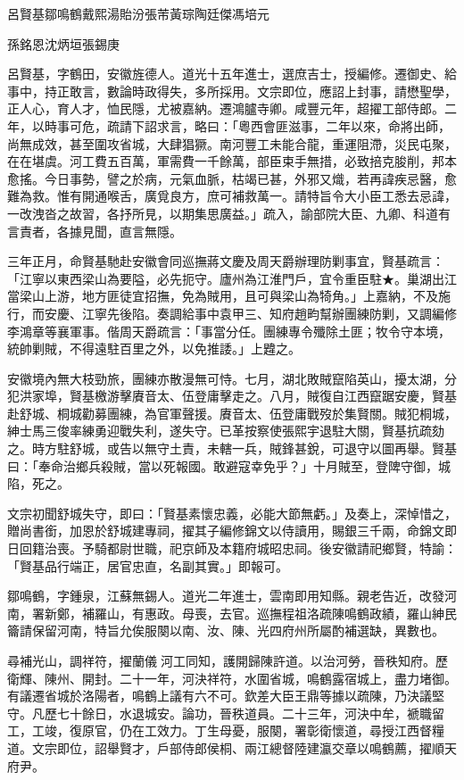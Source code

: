 
\begin{pinyinscope}
呂賢基鄒鳴鶴戴熙湯貽汾張芾黃琮陶廷傑馮培元

孫銘恩沈炳垣張錫庚

呂賢基，字鶴田，安徽旌德人。道光十五年進士，選庶吉士，授編修。遷御史、給事中，持正敢言，數論時政得失，多所採用。文宗即位，應詔上封事，請懋聖學，正人心，育人才，恤民隱，尤被嘉納。遷鴻臚寺卿。咸豐元年，超擢工部侍郎。二年，以時事可危，疏請下詔求言，略曰：「粵西會匪滋事，二年以來，命將出師，尚無成效，甚至圍攻省城，大肆猖獗。南河豐工未能合龍，重運阻滯，災民屯聚，在在堪虞。河工費五百萬，軍需費一千餘萬，部臣束手無措，必致掊克朘削，邦本愈搖。今日事勢，譬之於病，元氣血脈，枯竭已甚，外邪又熾，若再諱疾忌醫，愈難為救。惟有開通喉舌，廣覓良方，庶可補救萬一。請特旨令大小臣工悉去忌諱，一改洩沓之故習，各抒所見，以期集思廣益。」疏入，諭部院大臣、九卿、科道有言責者，各據見聞，直言無隱。

三年正月，命賢基馳赴安徽會同巡撫蔣文慶及周天爵辦理防剿事宜，賢基疏言：「江寧以東西梁山為要隘，必先扼守。廬州為江淮門戶，宜令重臣駐★。巢湖出江當梁山上游，地方匪徒宜招撫，免為賊用，且可與梁山為犄角。」上嘉納，不及施行，而安慶、江寧先後陷。奏調給事中袁甲三、知府趙畇幫辦團練防剿，又調編修李鴻章等襄軍事。偕周天爵疏言：「事當分任。團練專令殲除土匪；牧令守本境，統帥剿賊，不得遠駐百里之外，以免推諉。」上韙之。

安徽境內無大枝勁旅，團練亦散漫無可恃。七月，湖北敗賊竄陷英山，擾太湖，分犯洪家埠，賢基檄游擊賡音太、伍登庸擊走之。八月，賊復自江西竄踞安慶，賢基赴舒城、桐城勸募團練，為官軍聲援。賡音太、伍登庸戰歿於集賢關。賊犯桐城，紳士馬三俊率練勇迎戰失利，遂失守。已革按察使張熙宇退駐大關，賢基抗疏劾之。時方駐舒城，或告以無守土責，未轄一兵，賊鋒甚銳，可退守以圖再舉。賢基曰：「奉命治鄉兵殺賊，當以死報國。敢避寇幸免乎？」十月賊至，登陴守御，城陷，死之。

文宗初聞舒城失守，即曰：「賢基素懷忠義，必能大節無虧。」及奏上，深悼惜之，贈尚書銜，加恩於舒城建專祠，擢其子編修錦文以侍讀用，賜銀三千兩，命錦文即日回籍治喪。予騎都尉世職，祀京師及本籍府城昭忠祠。後安徽請祀鄉賢，特諭：「賢基品行端正，居官忠直，名副其實。」即報可。

鄒鳴鶴，字鍾泉，江蘇無錫人。道光二年進士，雲南即用知縣。親老告近，改發河南，署新鄭，補羅山，有惠政。母喪，去官。巡撫程祖洛疏陳鳴鶴政績，羅山紳民籥請保留河南，特旨允俟服闋以南、汝、陳、光四府州所屬酌補選缺，異數也。

尋補光山，調祥符，擢蘭儀河工同知，護開歸陳許道。以治河勞，晉秩知府。歷衛輝、陳州、開封。二十一年，河決祥符，水圍省城，鳴鶴露宿城上，盡力堵御。有議遷省城於洛陽者，鳴鶴上議有六不可。欽差大臣王鼎等據以疏陳，乃決議堅守。凡歷七十餘日，水退城安。論功，晉秩道員。二十三年，河決中牟，褫職留工，工竣，復原官，仍在工效力。丁生母憂，服闋，署彰衛懷道，尋授江西督糧道。文宗即位，詔舉賢才，戶部侍郎侯桐、兩江總督陸建瀛交章以鳴鶴薦，擢順天府尹。


\end{pinyinscope}
